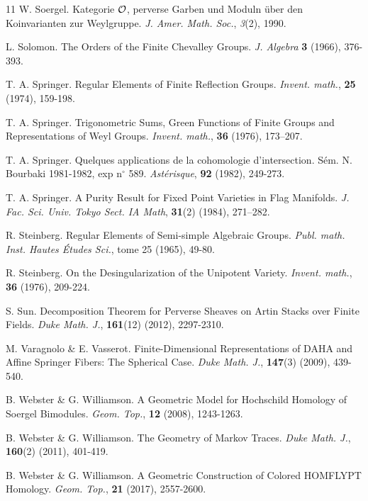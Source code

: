 \documentclass[a4paper,10pt,leqno]{amsart}
\theoremstyle{plain}
\theoremstyle{plain}
\theoremstyle{plain}
\theoremstyle{definition}
\theoremstyle{remark}
\begin{document}
\begin{thebibliography}{11}
	W. Soergel.
	Kategorie $\cal{O}$, perverse Garben und Moduln \"uber den Koinvarianten zur Weylgruppe.
	\textsl{J. Amer. Math. Soc.},
	\textsl{3}(2),
	1990.
	
	L. Solomon.
	The Orders of the Finite Chevalley Groups.
	\textsl{J. Algebra}
	\textbf{3}
	(1966),
	376-393.
	
	T. A. Springer.
	Regular Elements of Finite Reflection Groups.
	\textsl{Invent. math.},
	\textbf{25}
	(1974),
	159-198.

	T. A. Springer.
	Trigonometric Sums, Green Functions of Finite Groups and Representations of Weyl Groups.
	\textsl{Invent. math.},
	\textbf{36}
	(1976),
	173–207.
	
	T. A. Springer.
	Quelques applications de la cohomologie d'intersection.
	S\'em. N. Bourbaki 1981-1982, exp n$^\circ$ 589.
	\textsl{Ast\'erisque},
	\textbf{92}
	(1982),
	249-273.

	T. A. Springer.
	A Purity Result for Fixed Point Varieties in Flag Manifolds.
	\textsl{J. Fac. Sci. Univ. Tokyo Sect. IA Math},
	\textbf{31}(2)
	(1984),
	271–282.

	R. Steinberg.
	Regular Elements of Semi-simple Algebraic Groups.
	\textsl{Publ. math. Inst. Hautes \'Etudes Sci.},
	tome 25
	(1965),
	49-80.
	
	R. Steinberg.
	On the Desingularization of the Unipotent Variety.
	\textsl{Invent. math.},
	\textbf{36}
	(1976),
	209-224.
	
	S. Sun.
	Decomposition Theorem for Perverse Sheaves on Artin Stacks over Finite Fields.
	\textsl{Duke Math. J.},
	\textbf{161}(12)
	(2012),
	2297-2310.


	M. Varagnolo \& E. Vasserot.
	Finite-Dimensional Representations of DAHA and Affine Springer Fibers:
	The Spherical Case.
	\textsl{Duke Math. J.},
	\textbf{147}(3)
	(2009),
	439-540.
	
	B. Webster \& G. Williamson.
	A Geometric Model for Hochschild Homology of Soergel Bimodules.
	\textsl{Geom. Top.},
	\textbf{12}
	(2008),
	1243-1263.
	
	B. Webster \& G. Williamson.
	The Geometry of Markov Traces.
	\textsl{Duke Math. J.},
	\textbf{160}(2)
	(2011),
	401-419.
	
	B. Webster \& G. Williamson.
	A Geometric Construction of Colored HOMFLYPT Homology.
	\textsl{Geom. Top.},
	\textbf{21}
	(2017),
	2557-2600.
	
\end{thebibliography}
\end{document}
